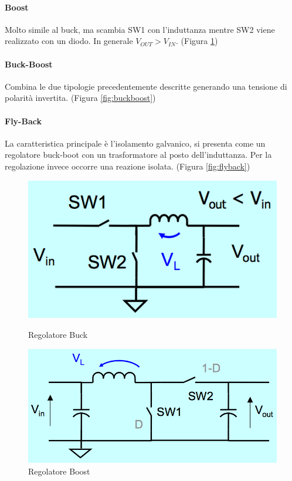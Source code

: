 \documentclass[12pt]{article}
\begin{document}
\paragraph{Boost} Molto simile al buck, ma scambia SW1 con l'induttanza mentre SW2 viene realizzato con un diodo. In generale $V_{OUT}>V_{IN}$. (Figura \ref{fig:boost})

\paragraph{Buck-Boost} Combina le due tipologie precedentemente descritte generando una tensione di polarità invertita. (Figura \ref{fig:buckboost})

\paragraph{Fly-Back} La caratteristica principale è l'isolamento galvanico, si presenta come un regolatore buck-boot con un trasformatore al posto dell'induttanza. Per la regolazione invece occorre una reazione isolata. (Figura \ref{fig:flyback})

\begin{figure}[!hbpt]
  \centering
  \begin{minipage}{.45\textwidth}
    \centering
    \includegraphics[width=\linewidth]{images/buck.png}
    \caption{Regolatore Buck}
    \label{fig:buck}
  \end{minipage}\hfill
  \begin{minipage}{.45\textwidth}
    \centering
    \includegraphics[width=\linewidth]{images/boost.png}
    \caption{Regolatore Boost}
    \label{fig:boost}
  \end{minipage}\hfill
\end{figure}
\end{document}
